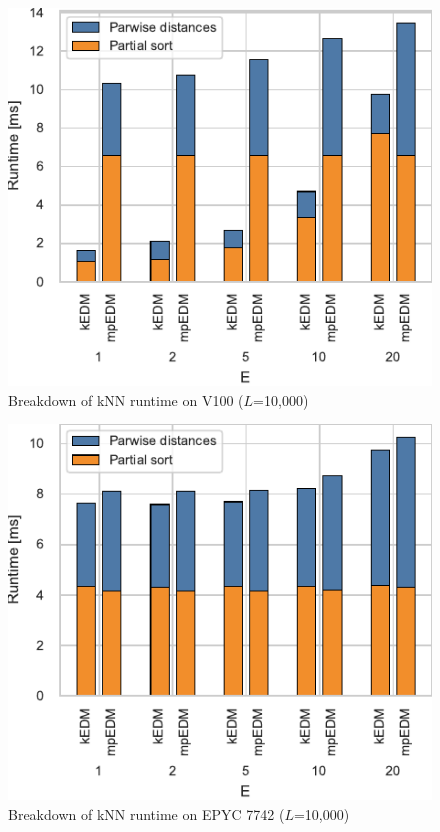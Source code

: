 \documentclass[conference]{IEEEtran}
\begin{document}
\begin{figure}
    \centering
    \includegraphics{figs/breakdown_knn_v100}
    \caption{Breakdown of kNN runtime on V100 ($L$=10,000)}%
    \label{fig:breakdown-knn-v100}
\end{figure}

\begin{figure}
    \centering
    \includegraphics{figs/breakdown_knn_epyc}
    \caption{Breakdown of kNN runtime on EPYC 7742 ($L$=10,000)}%
    \label{fig:breakdown-knn-epyc}
\end{figure}
\end{document}
